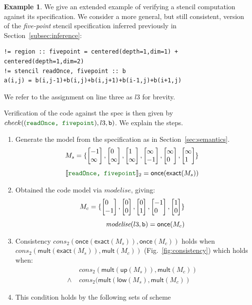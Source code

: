 \documentclass[9pt,preprint]{sigplanconf}
\newcounter{block}
\theoremstyle{definition}
\newtheorem{example}[block]{Example}
\newcommand{\interp}[1]{\llbracket{#1}\rrbracket}
\newcommand{\vtwo}[2]{\setlength{\arraycolsep}{0em}
\left[\begin{array}{l}#1\\#2\end{array}\right]}
\begin{document}
\begin{example}
We give an extended example of verifying a stencil computation against
its specification. We consider a more general, but still consistent, version of the \textit{five-point}
stencil specification inferred previously in
Section~\ref{subsec:inference}:
%
\begin{verbatim}
!= region :: fivepoint = centered(depth=1,dim=1) + centered(depth=1,dim=2)
!= stencil readOnce, fivepoint :: b
a(i,j) = b(i,j-1)+b(i,j)+b(i,j+1)+b(i-1,j)+b(i+1,j)
\end{verbatim}
%
We refer to the assignment on line three as $l3$ for brevity.

Verification of the code against the spec is then given by 
$check(({\textcolor{darkgreen}{\texttt{readOnce, fivepoint}}}),l3,\texttt{b})$. 
We explain the steps.
\begin{enumerate}  
%
\item Generate the model from the specification as in
  Section~\ref{sec:semantics}. 
%
\begin{align*}
 M_s= \{  \vtwo{-1}{\infty},
          \vtwo{0}{\infty},
          \vtwo{1}{\infty},
          \vtwo{\infty}{-1},
          \vtwo{\infty}{0},
        \vtwo{\infty}{1} \}  \\[0.4em]
\interp{{\textcolor{darkgreen}{\texttt{readOnce, fivepoint}}}}_2 =
  \textsf{once}(\textsf{exact} (M_s))
\end{align*}
%
\item Obtained the code model via $\textit{modelise}$, giving:
%
\begin{align*}
M_c = \{
    \vtwo{0}{-1},
    \vtwo{0}{0},
    \vtwo{0}{1},
    \vtwo{-1}{0},
    \vtwo{1}{0}
  \}
\\[0.4em]
\textit{modelise}(l3, \texttt{b}) = \textsf{once} (M_c)
\end{align*}
%
\item Consistency $cons_2(\textsf{once}(\textsf{exact}(M_s)),
  \textsf{once}(M_c))$ holds when 
  $\textit{cons}_2(\textsf{mult}(\textsf{exact}(M_s)),\textsf{mult}(M_c))$ (Fig.~\ref{fig:consistency}) 
  which holds when: 
  \begin{align*}
     & \textit{cons}_2(\textsf{mult}(\textsf{up}(M_s)),\textsf{mult}(M_c)) \\
   \wedge \; & \textit{cons}_2(\textsf{mult}(\textsf{low}(M_s),\textsf{mult}(M_c))
  \end{align*}
%
\item This condition holds by the following sets of scheme

\end{enumerate}
\end{example}
\end{document}
